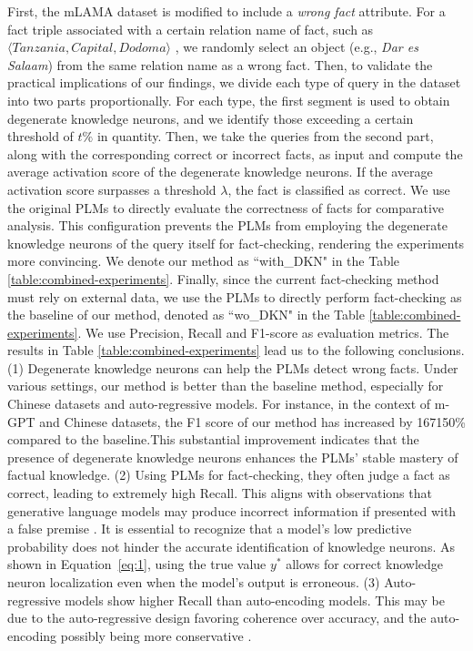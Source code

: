 \documentclass[]{article}
\begin{document}
First, the mLAMA dataset is modified to include a \textit{wrong fact} attribute.
For a fact triple associated with a certain relation name of fact, such as $\langle \textit{Tanzania}, \textit{Capital}, \textit{Dodoma} \rangle$ , we randomly select an object (e.g., \textit{Dar es Salaam}) from the same relation name as a wrong fact.
Then, to validate the practical implications of our findings, we divide each type of query in the dataset into two parts proportionally. For each type, the first segment is used to obtain degenerate knowledge neurons, and we identify those exceeding a certain threshold of \( t\% \) in quantity.
Then, we take the queries from the second part, along with the corresponding correct or incorrect facts, as input and compute the average activation score of the degenerate knowledge neurons. If the average activation score surpasses a threshold $\lambda$, the fact is classified as correct.
We use the original PLMs to directly evaluate the correctness of facts for comparative analysis. This configuration prevents the PLMs from employing the degenerate knowledge neurons of the query itself for fact-checking, rendering the experiments more convincing. We denote our method as ``with\_DKN" in the Table \ref{table:combined-experiments}.
Finally, since the current fact-checking method must rely on external data, we use the PLMs to directly perform fact-checking as the baseline of our method, denoted as ``wo\_DKN" in the Table \ref{table:combined-experiments}. We use Precision, Recall and F1-score as evaluation metrics.  The results in Table \ref{table:combined-experiments} lead us to the following conclusions.  (1) Degenerate knowledge neurons can help the PLMs detect wrong facts. Under various settings, our method is better than the baseline method, especially for Chinese datasets and auto-regressive models. For instance, in the context of m-GPT and Chinese datasets, the F1 score of our method has increased by 167150\% compared to the baseline.This substantial improvement indicates that the presence of degenerate knowledge neurons enhances the PLMs' stable mastery of factual knowledge.  (2) Using PLMs for fact-checking, they often judge a fact as correct, leading to extremely high Recall. This aligns with observations that generative language models may produce incorrect information if presented with a false premise \cite{hallucination_chatgpt3, lakshmanan2022large, metz2022new}.
It is essential to recognize that a model's low predictive probability does not hinder the accurate identification of knowledge neurons. As shown in Equation~\ref{eq:1}, using the true value \( y^* \) allows for correct knowledge neuron localization even when the model's output is erroneous.  (3) Auto-regressive models show higher Recall than auto-encoding models. This may be due to the auto-regressive design favoring coherence over accuracy, and the auto-encoding possibly being more conservative  \cite{zhou2023comprehensive}.
\end{document}
